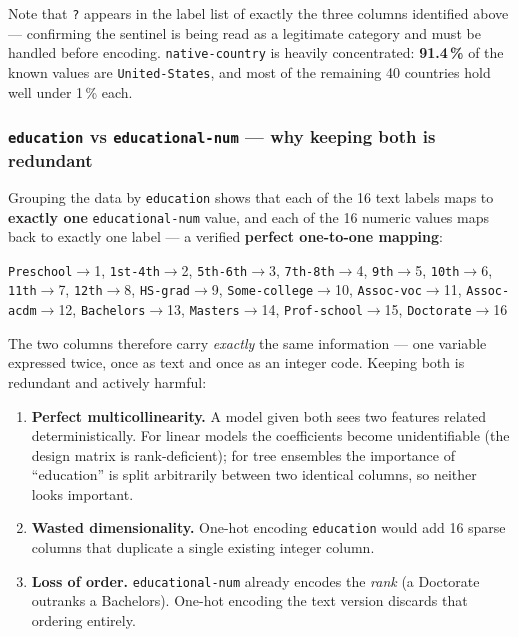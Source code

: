\documentclass[11pt,a4paper]{article}
\newcommand{\code}[1]{\texttt{\small #1}}
\begin{document}
\noindent
Note that \code{?} appears in the label list of exactly the three columns identified above
--- confirming the sentinel is being read as a legitimate category and must be handled
before encoding. \code{native-country} is heavily concentrated: \textbf{91.4\,\%} of the
known values are \code{United-States}, and most of the remaining 40 countries hold well
under 1\,\% each.

\subsubsection*{\code{education} vs \code{educational-num} --- why keeping both is redundant}

Grouping the data by \code{education} shows that each of the 16 text labels maps to
\textbf{exactly one} \code{educational-num} value, and each of the 16 numeric values maps
back to exactly one label --- a verified \textbf{perfect one-to-one mapping}:

\begin{center}
\small
\code{Preschool}$\to$1, \code{1st-4th}$\to$2, \code{5th-6th}$\to$3, \code{7th-8th}$\to$4,
\code{9th}$\to$5, \code{10th}$\to$6, \code{11th}$\to$7, \code{12th}$\to$8,
\code{HS-grad}$\to$9, \code{Some-college}$\to$10, \code{Assoc-voc}$\to$11,
\code{Assoc-acdm}$\to$12, \code{Bachelors}$\to$13, \code{Masters}$\to$14,
\code{Prof-school}$\to$15, \code{Doctorate}$\to$16
\end{center}

\noindent
The two columns therefore carry \emph{exactly} the same information --- one variable
expressed twice, once as text and once as an integer code. Keeping both is redundant and
actively harmful:

\begin{enumerate}
  \item \textbf{Perfect multicollinearity.} A model given both sees two features related
        deterministically. For linear models the coefficients become unidentifiable (the
        design matrix is rank-deficient); for tree ensembles the importance of ``education''
        is split arbitrarily between two identical columns, so neither looks important.
  \item \textbf{Wasted dimensionality.} One-hot encoding \code{education} would add 16
        sparse columns that duplicate a single existing integer column.
  \item \textbf{Loss of order.} \code{educational-num} already encodes the \emph{rank}
        (a Doctorate outranks a Bachelors). One-hot encoding the text version discards that
        ordering entirely.
\end{enumerate}
\end{document}
